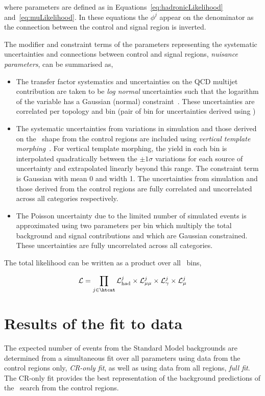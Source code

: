 where parameters are defined as in Equations~\ref{eq:hadronicLikelihood} and~\ref{eq:muLikelihood}. 
In these equations the $\phi^{j}$ appear on the denominator as the connection between the control and signal region is 
inverted.

The modifier and constraint terms of the parameters representing the systematic uncertainties and 
connections between control and signal regions, \emph{nuisance parameters}, can be summarised as,
\begin{itemize}
\item The transfer factor systematics and uncertainties on the QCD multijet contribution 
are taken to be \emph{log normal} uncertainties such that the logarithm of the variable has 
a Gaussian (normal) constraint~\cite{templateMorphing}. These uncertainties are correlated per topology and \scalht bin 
(pair of \scalht bin for uncertainties derived using \mmj)
\item The systematic uncertainties from variations in simulation and those derived on the \mht~shape from the control regions 
are included using \emph{vertical template morphing}~\cite{templateMorphing}. For vertical template morphing, the yield
in each bin is interpolated quadratically between the $\pm 1\sigma$ variations for each source of
uncertainty and extrapolated linearly beyond this range. The constraint term is Gaussian
with mean 0 and width 1. The uncertainties from simulation and those derived from the control regions
are fully correlated and uncorrelated across all categories respectively.
\item The Poisson uncertainty due to the limited number of simulated events is approximated using
two parameters per bin which multiply the total background and signal contributions and which 
are Gaussian constrained. These uncertainties are fully uncorrelated across all categories.
\end{itemize}

The total likelihood can be written as a product over all \htcat~bins,

\begin{equation}
\label{eq:totalLikelihood}
\mathcal{L} = \prod_{j\in\htcat} \mathcal{L}^{j}_{\mathrm{had}} \times \mathcal{L}^{j}_{\mathrm{\mu\mu}} 
\times \mathcal{L}^{j}_{\mathrm{\gamma}} \times \mathcal{L}^{j}_{\mathrm{\mu}}
\end{equation}


\section{Results of the fit to data}
\label{sec:results}
The expected number of events from the Standard Model backgrounds are determined from 
a simultaneous fit over all parameters using data from the control regions only, \emph{CR-only fit},
as well as using data from all regions, \emph{full fit}. The CR-only fit provides the 
best representation of the background predictions of the \alphat~search from the control regions.

